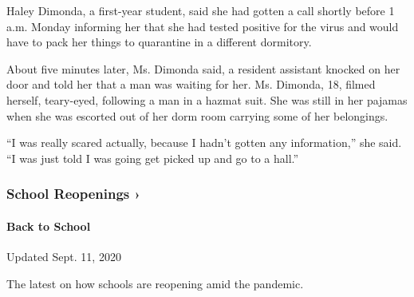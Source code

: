 Haley Dimonda, a first-year student, said she had gotten a call shortly
before 1 a.m. Monday informing her that she had tested positive for the
virus and would have to pack her things to quarantine in a different
dormitory.

About five minutes later, Ms. Dimonda said, a resident assistant knocked
on her door and told her that a man was waiting for her. Ms. Dimonda,
18, filmed herself, teary-eyed, following a man in a hazmat suit. She
was still in her pajamas when she was escorted out of her dorm room
carrying some of her belongings.

``I was really scared actually, because I hadn't gotten any
information,'' she said. ``I was just told I was going get picked up and
go to a hall.''

\href{https://www.nytimes3xbfgragh.onion/spotlight/schools-reopening?action=click\&pgtype=Article\&state=default\&region=MAIN_CONTENT_3\&context=storylines_keepup}{}

\hypertarget{school-reopenings-}{%
\subsubsection{School Reopenings ›}\label{school-reopenings-}}

\hypertarget{back-to-school}{%
\paragraph{Back to School}\label{back-to-school}}

Updated Sept. 11, 2020

The latest on how schools are reopening amid the pandemic.

